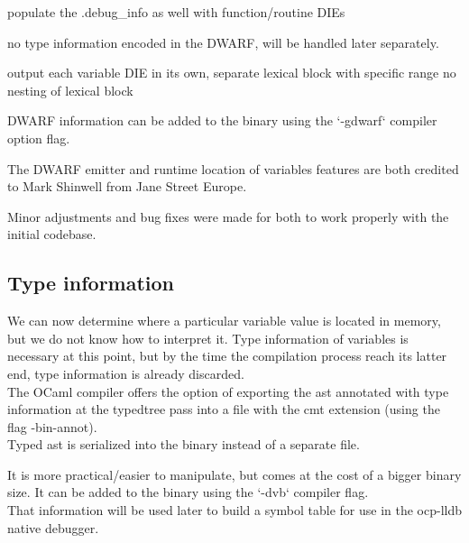 populate the  .debug\_info as well with function/routine DIEs

no type information encoded in the DWARF, will be handled later separately.

output each variable DIE in its own, separate lexical block with specific range
no nesting of lexical block

DWARF information can be added to the binary using the `-gdwarf` compiler option flag.

The DWARF emitter and runtime location of variables features are both credited to
Mark Shinwell from Jane Street Europe.

Minor adjustments and bug fixes were made for both to work properly with the initial codebase.

\subsection{Type information}

We can now determine where a particular variable value is located in memory, but
we do not know how to interpret it. Type information of variables is necessary
at this point, but by the time the compilation process reach its latter end,
type information is already discarded. \\

The OCaml compiler offers the option of exporting the \gls{ast} annotated with type
information at the typedtree pass into a file with the cmt extension (using the
flag -bin-annot). \\

Typed \gls{ast} is serialized into the binary instead of a separate file.

It is more practical/easier to manipulate, but comes at the cost of a bigger binary
size.
It can be added to the binary using the `-dvb` compiler flag.\\

That information will be used later to build a symbol table for use in the
ocp-lldb native debugger.

